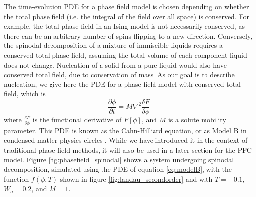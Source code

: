 The time-evolution PDE for a phase field model is chosen depending on whether the total phase field (i.e. the integral of the field over all space) is conserved. For example, the total phase field in an Ising model is not necessarily conserved, as there can be an arbitrary number of spins flipping to a new direction. Conversely, the spinodal decomposition of a mixture of immiscible liquids requires a conserved total phase field, assuming the total volume of each component liquid does not change. Nucleation of a solid from a pure liquid would also have conserved total field, due to conservation of mass. As our goal is to describe nucleation, we give here the PDE for a phase field model with conserved total field, which is
\begin{equation}\label{eq:modelB}
\frac{\partial\phi}{\partial t}=M\nabla^2\frac{\delta F}{\delta \phi}
\end{equation}
where $\frac{\delta F}{\delta \phi}$ is the functional derivative of $F[\phi]$, and $M$ is a solute mobility parameter. This PDE is known as the Cahn-Hilliard equation, or as Model B in condensed matter physics circles \cite{hohenberg77}. While we have introduced it in the context of traditional phase field methods, it will also be used in a later section for the PFC model. Figure \ref{fig:phasefield_spinodal} shows a system undergoing spinodal decomposition, simulated using the PDE of equation \ref{eq:modelB}, with the function $f(\phi,T)$ shown in figure \ref{fig:landau_secondorder} and with $T=-0.1$, $W_o=0.2$, and $M=1$.

